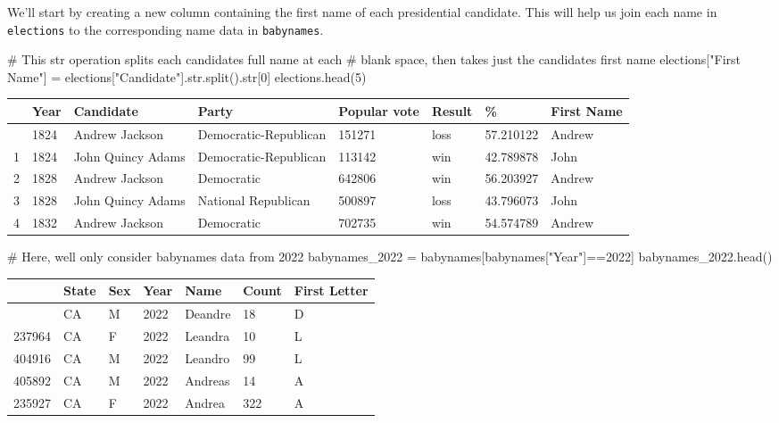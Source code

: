 \documentclass[
  letterpaper,
  DIV=11,
  numbers=noendperiod]{scrreprt}
\newenvironment{Shaded}{\begin{snugshade}}{\end{snugshade}}
\newcommand{\BuiltInTok}[1]{\textcolor[rgb]{0.00,0.23,0.31}{#1}}
\newcommand{\CommentTok}[1]{\textcolor[rgb]{0.37,0.37,0.37}{#1}}
\newcommand{\DecValTok}[1]{\textcolor[rgb]{0.68,0.00,0.00}{#1}}
\newcommand{\NormalTok}[1]{\textcolor[rgb]{0.00,0.23,0.31}{#1}}
\newcommand{\OperatorTok}[1]{\textcolor[rgb]{0.37,0.37,0.37}{#1}}
\newcommand{\StringTok}[1]{\textcolor[rgb]{0.13,0.47,0.30}{#1}}
\begin{document}
We'll start by creating a new column containing the first name of each
presidential candidate. This will help us join each name in
\texttt{elections} to the corresponding name data in \texttt{babynames}.

\begin{Shaded}
\begin{Highlighting}[]
\CommentTok{\# This \textasciigrave{}str\textasciigrave{} operation splits each candidate\textquotesingle{}s full name at each }
\CommentTok{\# blank space, then takes just the candidate\textquotesingle{}s first name}
\NormalTok{elections[}\StringTok{"First Name"}\NormalTok{] }\OperatorTok{=}\NormalTok{ elections[}\StringTok{"Candidate"}\NormalTok{].}\BuiltInTok{str}\NormalTok{.split().}\BuiltInTok{str}\NormalTok{[}\DecValTok{0}\NormalTok{]}
\NormalTok{elections.head(}\DecValTok{5}\NormalTok{)}
\end{Highlighting}
\end{Shaded}

\begin{longtable}[]{@{}llllllll@{}}
\toprule\noalign{}
& Year & Candidate & Party & Popular vote & Result & \% & First Name \\
\midrule\noalign{}
\endhead
\bottomrule\noalign{}
\endlastfoot
0 & 1824 & Andrew Jackson & Democratic-Republican & 151271 & loss &
57.210122 & Andrew \\
1 & 1824 & John Quincy Adams & Democratic-Republican & 113142 & win &
42.789878 & John \\
2 & 1828 & Andrew Jackson & Democratic & 642806 & win & 56.203927 &
Andrew \\
3 & 1828 & John Quincy Adams & National Republican & 500897 & loss &
43.796073 & John \\
4 & 1832 & Andrew Jackson & Democratic & 702735 & win & 54.574789 &
Andrew \\
\end{longtable}

\begin{Shaded}
\begin{Highlighting}[]
\CommentTok{\# Here, we\textquotesingle{}ll only consider \textasciigrave{}babynames\textasciigrave{} data from 2022}
\NormalTok{babynames\_2022 }\OperatorTok{=}\NormalTok{ babynames[babynames[}\StringTok{"Year"}\NormalTok{]}\OperatorTok{==}\DecValTok{2022}\NormalTok{]}
\NormalTok{babynames\_2022.head()}
\end{Highlighting}
\end{Shaded}

\begin{longtable}[]{@{}lllllll@{}}
\toprule\noalign{}
& State & Sex & Year & Name & Count & First Letter \\
\midrule\noalign{}
\endhead
\bottomrule\noalign{}
\endlastfoot
405695 & CA & M & 2022 & Deandre & 18 & D \\
237964 & CA & F & 2022 & Leandra & 10 & L \\
404916 & CA & M & 2022 & Leandro & 99 & L \\
405892 & CA & M & 2022 & Andreas & 14 & A \\
235927 & CA & F & 2022 & Andrea & 322 & A \\
\end{longtable}
\end{document}
